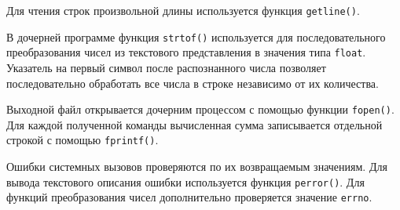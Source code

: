 Для чтения строк произвольной длины используется функция
\texttt{getline()}.

В дочерней программе функция \texttt{strtof()} используется для
последовательного преобразования чисел из текстового представления
в значения типа \texttt{float}. Указатель на первый символ после
распознанного числа позволяет последовательно обработать все числа
в строке независимо от их количества.

Выходной файл открывается дочерним процессом с помощью функции
\texttt{fopen()}. Для каждой полученной команды вычисленная сумма
записывается отдельной строкой с помощью \texttt{fprintf()}.

Ошибки системных вызовов проверяются по их возвращаемым значениям.
Для вывода текстового описания ошибки используется функция
\texttt{perror()}. Для функций преобразования чисел дополнительно
проверяется значение \texttt{errno}.